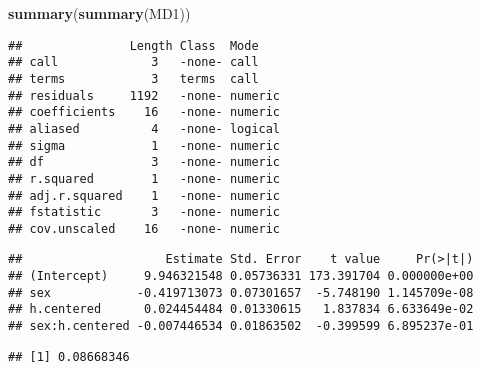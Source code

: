 \documentclass[]{article}
\newenvironment{Shaded}{\begin{snugshade}}{\end{snugshade}}
\newcommand{\KeywordTok}[1]{\textcolor[rgb]{0.13,0.29,0.53}{\textbf{#1}}}
\newcommand{\NormalTok}[1]{#1}
\newcommand{\OperatorTok}[1]{\textcolor[rgb]{0.81,0.36,0.00}{\textbf{#1}}}
\begin{document}
\begin{Shaded}
\begin{Highlighting}[]
\KeywordTok{summary}\NormalTok{(}\KeywordTok{summary}\NormalTok{(MD1))}
\end{Highlighting}
\end{Shaded}

\begin{verbatim}
##               Length Class  Mode   
## call             3   -none- call   
## terms            3   terms  call   
## residuals     1192   -none- numeric
## coefficients    16   -none- numeric
## aliased          4   -none- logical
## sigma            1   -none- numeric
## df               3   -none- numeric
## r.squared        1   -none- numeric
## adj.r.squared    1   -none- numeric
## fstatistic       3   -none- numeric
## cov.unscaled    16   -none- numeric
\end{verbatim}

\begin{Shaded}
\end{Shaded}

\begin{verbatim}
##                    Estimate Std. Error    t value     Pr(>|t|)
## (Intercept)     9.946321548 0.05736331 173.391704 0.000000e+00
## sex            -0.419713073 0.07301657  -5.748190 1.145709e-08
## h.centered      0.024454484 0.01330615   1.837834 6.633649e-02
## sex:h.centered -0.007446534 0.01863502  -0.399599 6.895237e-01
\end{verbatim}

\begin{Shaded}
\end{Shaded}

\begin{verbatim}
## [1] 0.08668346
\end{verbatim}

\begin{Shaded}
\end{Shaded}
\end{document}
